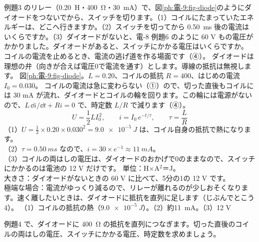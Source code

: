 \label{ph:電-9:ex4}
\begin{phreidai}[コイルにダイオードをつなぐわけ]
例題3 のリレー（\qty{0.20}{H}・\qty{400}{\ohm}・\qty{30}{mA}）で、図\ref{ph:電-9:fig-diode}のようにダイオードをつないでから、スイッチを切ります。（1）コイルにたまっていたエネルギーは、どこへ行きますか。（2）スイッチを切ってから \qty{0.50}{ms} 後の電流はいくらですか。（3）ダイオードがないと、電-8 例題6 のように 60 V もの電圧がかかりました。ダイオードがあると、スイッチにかかる電圧はいくらですか。
\phbamen
コイルの電流を止めるとき、電流の逃げ道を作る場面です（④）。
\phmushi
ダイオードは理想の弁（向きが合えば電圧0で電流を通す）とします。導線の抵抗は無視します。
\phzu
図\ref{ph:電-9:fig-diode}。$L=0.20$、コイルの抵抗 $R=400$、はじめの電流 $I_0=0.030$。
\phriyu
コイルの電流は急に変わらない（①）ので、切った直後もコイルには 30 mA が流れ、ダイオードとコイルの輪を回ります。この輪には電源がないので、$L\,\dd i/\dd t+Ri=0$ で、時定数 $L/R$ で減ります（④）。
\phtateru
\[ U=\frac12LI_0^{\,2},\qquad i=I_0\,e^{-t/\tau},\qquad\tau=\frac{L}{R} \]
\phtoku
（1）$U=\tfrac12\times0.20\times0.030^2=\qty{9.0e-5}{J}$ は、コイル自身の抵抗で熱になります。\\
（2）$\tau=\qty{0.50}{ms}$ なので、$i=30\times e^{-1}\approx\qty{11}{mA}$。\\
（3）コイルの両はしの電圧は、ダイオードのおかげで0のままなので、スイッチにかかるのは電池の 12 V だけです。
\phtashikame
単位：H×A$^2$＝J。\\
大きさ：ダイオードがないときの 60 V に比べて、5分の1の 12 V です。\\
極端な場合：電流がゆっくり減るので、リレーが離れるのが少しおそくなります。速く離したいときは、ダイオードに抵抗を直列に足します（じぶんでとこう4）。
\kotae （1）コイルの抵抗の熱（$\qty{9.0e-5}{J}$）。（2）約\qty{11}{mA}。（3）12 V
\end{phreidai}
\begin{jibun}
例題4 で、ダイオードに \qty{400}{\ohm} の抵抗を直列につなぎます。切った直後のコイルの両はしの電圧、スイッチにかかる電圧、時定数を求めましょう。
\end{jibun}

